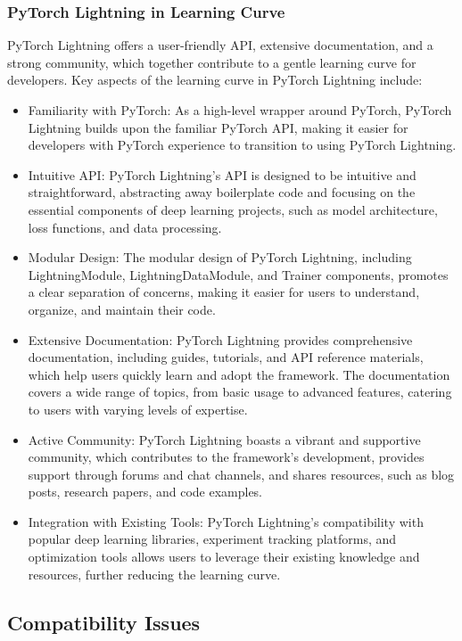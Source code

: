 \documentclass[12pt]{article}
\begin{document}
\subsubsection{PyTorch Lightning in Learning Curve}

PyTorch Lightning offers a user-friendly API, extensive documentation, and a strong community, which together contribute to a gentle learning curve for developers. Key aspects of the learning curve in PyTorch Lightning include:

\begin{itemize}
    \item Familiarity with PyTorch: As a high-level wrapper around PyTorch, PyTorch Lightning builds upon the familiar PyTorch API, making it easier for developers with PyTorch experience to transition to using PyTorch Lightning.
    \item Intuitive API: PyTorch Lightning's API is designed to be intuitive and straightforward, abstracting away boilerplate code and focusing on the essential components of deep learning projects, such as model architecture, loss functions, and data processing.
    \item Modular Design: The modular design of PyTorch Lightning, including LightningModule, LightningDataModule, and Trainer components, promotes a clear separation of concerns, making it easier for users to understand, organize, and maintain their code.
    \item Extensive Documentation: PyTorch Lightning provides comprehensive documentation, including guides, tutorials, and API reference materials, which help users quickly learn and adopt the framework. The documentation covers a wide range of topics, from basic usage to advanced features, catering to users with varying levels of expertise.
    \item Active Community: PyTorch Lightning boasts a vibrant and supportive community, which contributes to the framework's development, provides support through forums and chat channels, and shares resources, such as blog posts, research papers, and code examples.
    \item Integration with Existing Tools: PyTorch Lightning's compatibility with popular deep learning libraries, experiment tracking platforms, and optimization tools allows users to leverage their existing knowledge and resources, further reducing the learning curve.
\end{itemize}

\subsection{Compatibility Issues}
\end{document}
